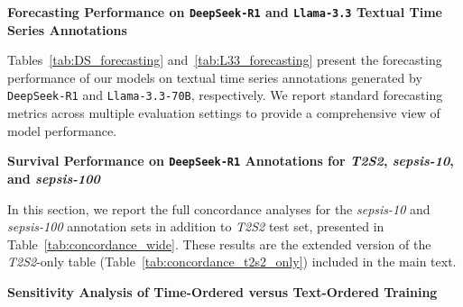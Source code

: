 {
\noindent\Large\bfseries\thesection\quad Forecasting Performance on \texttt{DeepSeek-R1} and \texttt{Llama-3.3} Textual Time Series Annotations
\label{apd:full_tables}}

\vspace{0em}

Tables~\ref{tab:DS_forecasting} and~\ref{tab:L33_forecasting} present the forecasting performance of our models on textual time series annotations generated by \texttt{DeepSeek-R1} and \texttt{Llama-3.3-70B}, respectively. We report standard forecasting metrics across multiple evaluation settings to provide a comprehensive view of model performance. 





\clearpage
{
\noindent\Large\bfseries\thesection\quad Survival Performance on \texttt{DeepSeek-R1} Annotations for \textit{T2S2}, \textit{sepsis-10}, and \textit{sepsis-100}
\label{apd:full_survival}}
\vspace{1em}

In this section, we report the full concordance analyses for the \textit{sepsis-10} and \textit{sepsis-100} annotation sets in addition to \textit{T2S2} test set, presented in Table~\ref{tab:concordance_wide}. These results are the extended version of the \textit{T2S2}-only table (Table~\ref{tab:concordance_t2s2_only}) included in the main text.




\vspace{2em}

{
\noindent\Large\bfseries\thesection\quad Sensitivity Analysis of Time-Ordered versus Text-Ordered Training
\label{apd:sensitivity_analyses}}

